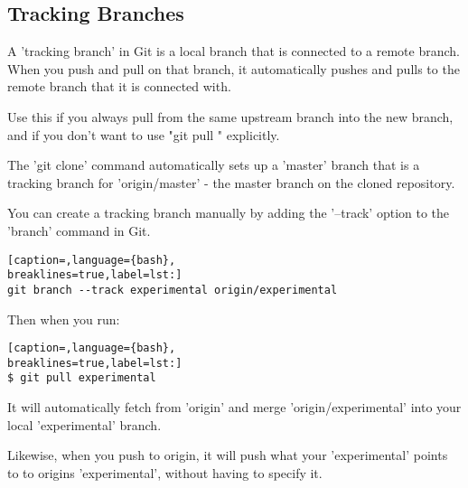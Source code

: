 \subsection{Tracking Branches}
A 'tracking branch' in Git is a local branch that is connected to a remote
branch. When you push and pull on that branch, it automatically pushes and
pulls to the remote branch that it is connected with.

Use this if you always pull from the same upstream branch into the new branch,
and if you don't want to use "git pull " explicitly.

The 'git clone' command automatically sets up a 'master' branch that is a
tracking branch for 'origin/master' - the master branch on the cloned
repository.

You can create a tracking branch manually by adding the '--track' option to the
'branch' command in Git.
\lstset{basicstyle=\scriptsize, numbers=none, captionpos=b, tabsize=4}
\begin{lstlisting}[caption=,language={bash},
breaklines=true,label=lst:]
git branch --track experimental origin/experimental
\end{lstlisting}

Then when you run:
\lstset{basicstyle=\scriptsize, numbers=none, captionpos=b, tabsize=4}
\begin{lstlisting}[caption=,language={bash},
breaklines=true,label=lst:]
$ git pull experimental
\end{lstlisting}

It will automatically fetch from 'origin' and merge 'origin/experimental' into
your local 'experimental' branch.

Likewise, when you push to origin, it will push what your 'experimental' points
to to origins 'experimental', without having to specify it.
